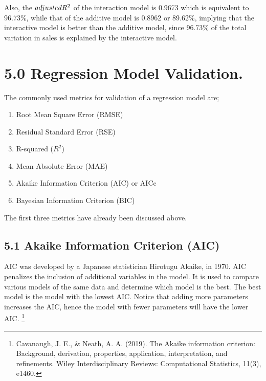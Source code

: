 \documentclass[
]{article}
\begin{document}
Also, the \(adjusted\space R^2\) of the interaction model is 0.9673
which is equivalent to 96.73\%, while that of the additive model is
0.8962 or 89.62\%, implying that the interactive model is better than
the additive model, since 96.73\% of the total variation in sales is
explained by the interactive model.

\newpage

\hypertarget{regression-model-validation.}{%
\section{5.0 Regression Model
Validation.}\label{regression-model-validation.}}

The commonly used metrics for validation of a regression model are;

\begin{enumerate}
\def\labelenumi{\arabic{enumi}.}
\item
  Root Mean Square Error (RMSE)
\item
  Residual Standard Error (RSE)
\item
  R-squared (\(R^2\))
\item
  Mean Absolute Error (MAE)
\item
  Akaike Information Criterion (AIC) or AICc
\item
  Bayesian Information Criterion (BIC)
\end{enumerate}

The first three metrics have already been discussed above.

\hypertarget{akaike-information-criterion-aic}{%
\subsection{5.1 Akaike Information Criterion
(AIC)}\label{akaike-information-criterion-aic}}

AIC was developed by a Japanese statistician Hirotugu Akaike, in 1970.
AIC penalizes the inclusion of additional variables in the model. It is
used to compare various models of the same data and determine which
model is the best. The best model is the model with the lowest AIC.
Notice that adding more parameters increases the AIC, hence the model
with fewer parameters will have the lower AIC. \footnote{Cavanaugh, J.
  E., \& Neath, A. A. (2019). The Akaike information criterion:
  Background, derivation, properties, application, interpretation, and
  refinements. Wiley Interdisciplinary Reviews: Computational
  Statistics, 11(3), e1460.}
\end{document}
